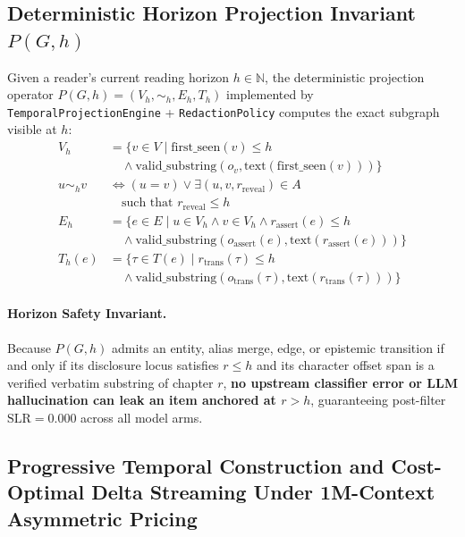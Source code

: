 \documentclass[11pt,twocolumn]{article}
\begin{document}
\subsection{\texorpdfstring{Deterministic Horizon Projection Invariant $P(G, h)$}{Deterministic Horizon Projection Invariant P(G, h)}}
\label{sec:projection_invariant}

Given a reader's current reading horizon $h \in \mathbb{N}$, the deterministic projection operator $P(G, h) = (V_h, \sim_h, E_h, T_h)$ implemented by \texttt{TemporalProjectionEngine} + \texttt{RedactionPolicy} computes the exact subgraph visible at $h$:
\begin{align}
V_h &= \{v \in V \mid \text{first\_seen}(v) \le h \nonumber\\
    &\quad \land \text{valid\_substring}(o_v, \text{text}(\text{first\_seen}(v)))\} \\
u \sim_h v &\iff (u = v) \lor \exists (u, v, r_{\text{reveal}}) \in A \nonumber\\
    &\quad \text{such that } r_{\text{reveal}} \le h \\
E_h &= \{e \in E \mid u \in V_h \land v \in V_h \land r_{\text{assert}}(e) \le h \nonumber\\
    &\quad \land \text{valid\_substring}(o_{\text{assert}}(e), \text{text}(r_{\text{assert}}(e)))\} \\
T_h(e) &= \{\tau \in T(e) \mid r_{\text{trans}}(\tau) \le h \nonumber\\
    &\quad \land \text{valid\_substring}(o_{\text{trans}}(\tau), \text{text}(r_{\text{trans}}(\tau)))\}
\end{align}

\paragraph{Horizon Safety Invariant.} Because $P(G, h)$ admits an entity, alias merge, edge, or epistemic transition if and only if its disclosure locus satisfies $r \le h$ and its character offset span is a verified verbatim substring of chapter $r$, \textbf{no upstream classifier error or LLM hallucination can leak an item anchored at $r > h$}, guaranteeing post-filter $\text{SLR} = 0.000$ across all model arms.

\subsection{Progressive Temporal Construction and Cost-Optimal Delta Streaming Under 1M-Context Asymmetric Pricing}
\label{sec:temporal_cost_design}
\end{document}
